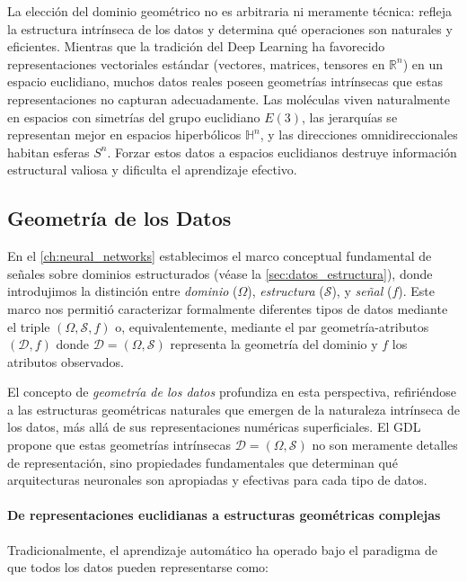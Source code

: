 La elección del dominio geométrico no es arbitraria ni meramente técnica: refleja la estructura intrínseca de los datos y determina qué operaciones son naturales y eficientes. Mientras que la tradición del Deep Learning ha favorecido representaciones vectoriales estándar (vectores, matrices, tensores en $\mathbb{R}^n$) en un espacio euclidiano, muchos datos reales poseen geometrías intrínsecas que estas representaciones no capturan adecuadamente. Las moléculas viven naturalmente en espacios con simetrías del grupo euclidiano $E(3)$, las jerarquías se representan mejor en espacios hiperbólicos $\mathbb{H}^n$, y las direcciones omnidireccionales habitan esferas $S^n$. Forzar estos datos a espacios euclidianos destruye información estructural valiosa y dificulta el aprendizaje efectivo.

\subsection{Geometría de los Datos}\label{subsec:geometria_datos}

En el \autoref{ch:neural_networks} establecimos el marco conceptual fundamental de señales sobre dominios estructurados (véase la \autoref{sec:datos_estructura}), donde introdujimos la distinción entre \textit{dominio} ($\Omega$), \textit{estructura} ($\mathcal{S}$), y \textit{señal} ($f$). Este marco nos permitió caracterizar formalmente diferentes tipos de datos mediante el triple $(\Omega, \mathcal{S}, f)$ o, equivalentemente, mediante el par geometría-atributos $(\mathcal{D}, f)$ donde $\mathcal{D} = (\Omega, \mathcal{S})$ representa la geometría del dominio y $f$ los atributos observados.

El concepto de \textit{geometría de los datos} profundiza en esta perspectiva, refiriéndose a las estructuras geométricas naturales que emergen de la naturaleza intrínseca de los datos, más allá de sus representaciones numéricas superficiales. El \gls{GDL} propone que estas geometrías intrínsecas $\mathcal{D} = (\Omega, \mathcal{S})$ no son meramente detalles de representación, sino propiedades fundamentales que determinan qué arquitecturas neuronales son apropiadas y efectivas para cada tipo de datos.

\paragraph{De representaciones euclidianas a estructuras geométricas complejas}

Tradicionalmente, el aprendizaje automático ha operado bajo el paradigma de que todos los datos pueden representarse como:

